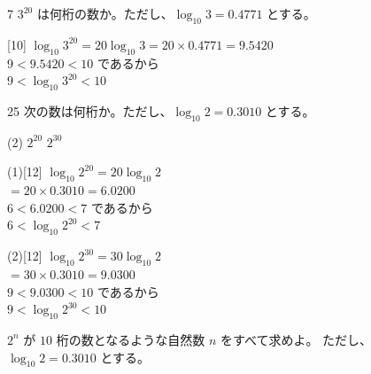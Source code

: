 \documentclass[14pt,dvipdfmx]{jsarticle}
\begin{document}
\vfill
\nextpage

\vspace{-1.4zw}

\begin{exampleprob}{7}
  $3^{20}$ は何桁の数か。ただし、$\log_{10} 3 = 0.4771$ とする。
\end{exampleprob}

\begin{answerbox}{}[10]
  $\log_{10} 3^{20} = 20\log_{10} 3 = 20 \times 0.4771 = 9.5420$\\
  $9 < 9.5420 < 10$ であるから\\
  $9 < \log_{10} 3^{20} < 10$\\
\end{answerbox}

\vspace{0.2em}
\begin{practiceprob}{25}
  次の数は何桁か。ただし、$\log_{10} 2 = 0.3010$ とする。
  \begin{tasks}[label=(\arabic*), label-width=1.6zw, item-indent=2zw, after-item-skip=0.06em](2)
    \task $2^{20}$
    \task $2^{30}$
  \end{tasks}
\end{practiceprob}

\noindent
\begin{minipage}[t]{0.48\linewidth}
\begin{answerbox}{(1)}[12]
  $\log_{10} 2^{20} = 20\log_{10} 2$\\
  $= 20 \times 0.3010 = 6.0200$\\
  $6 < 6.0200 < 7$ であるから\\
  $6 < \log_{10} 2^{20} < 7$
\end{answerbox}
\end{minipage}\hfill
\begin{minipage}[t]{0.48\linewidth}
\begin{answerbox}{(2)}[12]
  $\log_{10} 2^{30} = 30\log_{10} 2$\\
  $= 30 \times 0.3010 = 9.0300$\\
  $9 < 9.0300 < 10$ であるから\\
  $9 < \log_{10} 2^{30} < 10$
\end{answerbox}
\end{minipage}

\vspace{1em}
\quad
$2^{n}$ が $10$ 桁の数となるような自然数 $n$ をすべて求めよ。
ただし、$\log_{10} 2 = 0.3010$ とする。
\end{document}
